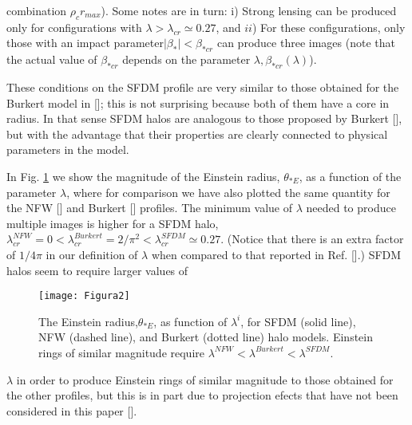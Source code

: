 \documentclass{article}
\begin{document}
\begin{multicols}{2}
combination $\rho_cr_{max}$). Some notes are in turn: i) Strong
lensing can be produced only for configurations with $\lambda>\lambda_{cr}\simeq 0.27$, and $ii$) For these 
configurations, only those with an impact parameter$|\beta_*|<\beta_{*cr}$ can produce three
images (note that the actual value of $\beta_{*cr}$ depends on the
parameter $\lambda, \beta_{*cr}(\lambda)$).\par
These conditions on the SFDM profile are very similar
to those obtained for the Burkert model in [\cite{15}]; this is not
surprising because both of them have a core in radius. In
that sense SFDM halos are analogous to those proposed
by Burkert [\cite{16}], but with the advantage that their properties
are clearly connected to physical parameters in the
model.\par
In Fig. \ref{fig:figura2} we show the magnitude of the Einstein radius,
$\theta_{*E}$, as a function of the parameter $\lambda$, where for
comparison we have also plotted the same quantity for
the NFW [\cite{17}] and Burkert [\cite{15}] profiles. The minimum
value of $\lambda$ needed to produce multiple images is higher for
a SFDM halo, $\lambda^{NFW}_{cr}=0<\lambda^{Burkert}_{cr}=2/\pi^2<\lambda^{SFDM}_{cr}\simeq0.27$. 
(Notice that there is an extra factor of $1/4\pi$ in 
our definition of $\lambda$ when compared to that reported in
Ref. [\cite{15}].) SFDM halos seem to require larger values of
\begin{figure}
\graphicspath{{E:/Escuela/DCI Física/Herramientas Informáticas y Gestión de la Información}}
\texttt{[image: Figura2]}
\caption{The Einstein radius,$\theta_{*E}$, as function of $\lambda^i$, for
SFDM (solid line), NFW (dashed line), and Burkert (dotted
line) halo models. Einstein rings of similar magnitude require
$\lambda^{NFW}<\lambda^{Burkert}<\lambda^{SFDM}$.}
\label{fig:figura2}
\end{figure}
$\lambda$ in order to produce Einstein rings of similar magnitude
to those obtained for the other profiles, but this is in part
due to projection efects that have not been considered
in this paper [\cite{13, 18}].


\end{multicols}
\end{document}
